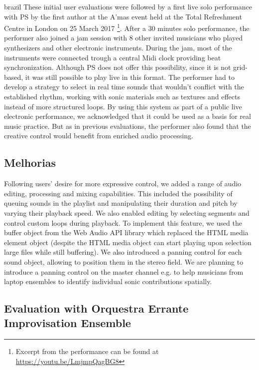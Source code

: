 \begin{otherlanguage*}{brazil}
These initial user evaluations were followed by a first live solo performance with PS by the first author at the A'mas event held at the Total Refreshment Centre in London on 25 March 2017 \footnote{Excerpt from the performance can be found at \url{https://youtu.be/LmjmpQagBG8}}. After a 30 minutes solo performance, the performer also joined a jam session with 8 other invited musicians who played synthesizers and other electronic instruments. During the jam, most of the instruments were connected trough a central Midi clock providing beat synchronization. Although PS does not offer this possibility, since it is not grid-based, it was still possible to play live in this format. The performer had to develop a strategy to select in real time sounds that wouldn't conflict with the established rhythm, working with sonic materials such as textures and effects instead of more structured loops. By using this system as part of a public live electronic performance, we acknowledged that it could be used as a basis for real music practice. But as in previous evaluations, the performer also found that the creative control would benefit from enriched audio processing.

\subsection{Melhorias}

Following users' desire for more expressive control, we added a range of audio editing, processing and mixing capabilities. This included the possibility of queuing sounds in the playlist and manipulating their duration and pitch by varying their playback speed. We also enabled editing by selecting segments and control custom loops during playback. To implement this feature, we used the buffer object from the Web Audio API library which replaced the HTML media element object (despite the HTML media object can start playing upon selection large files while still buffering). We also introduced a panning control for each sound object, allowing to position them in the stereo field. We are planning to introduce a panning control on the master channel e.g. to help musicians from laptop ensembles to identify individual sonic contributions spatially.

\subsection{Evaluation with Orquestra Errante Improvisation Ensemble}





\end{otherlanguage*}

